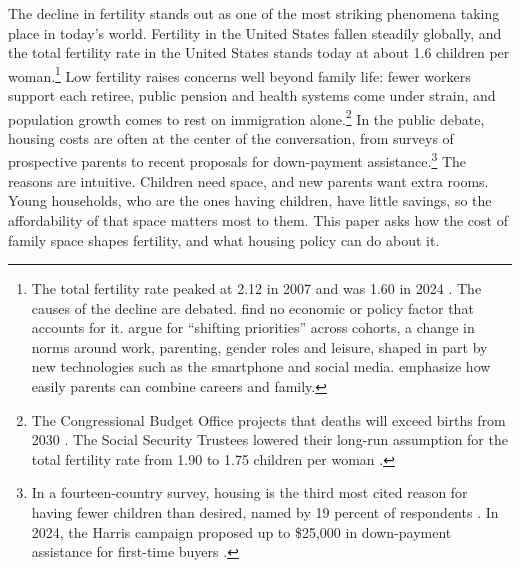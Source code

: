 
The decline in fertility stands out as one of the most striking phenomena taking place in today's world.   
Fertility in the United States  fallen steadily globally, and the
total fertility rate in the United States stands today at about 1.6 children per
woman.\footnote{The total fertility rate peaked at 2.12 in 2007 and was 1.60
in 2024 \citep{cboDemographicOutlook2026}. The causes of the decline are
debated. \citet{kearneyPuzzleFallingUS2022} find no economic or policy
factor that accounts for it. \citet{kearneyLevineWhyFertilityLow2025} argue
for ``shifting priorities'' across cohorts, a change in norms around work,
parenting, gender roles and leisure, shaped in part by new technologies such
as the smartphone and social media.
\citet{doepkeEconomicsFertilityNew2023} emphasize how easily parents can
combine careers and family.} Low fertility raises concerns well beyond
family life: fewer workers support each retiree, public pension and health
systems come under strain, and population growth comes to rest on
immigration alone.\footnote{The Congressional Budget Office projects that
deaths will exceed births from 2030 \citep{cboDemographicOutlook2026}. The
Social Security Trustees lowered their long-run assumption for the total
fertility rate from 1.90 to 1.75 children per woman \citep{ssaTrustees2026}.}
In the public debate, housing costs are often at the center of the
conversation, from surveys of prospective parents to recent proposals for
down-payment assistance.\footnote{In a fourteen-country survey, housing is
the third most cited reason for having fewer children than desired, named by
19 percent of respondents \citep{unfpaSWP2025}. In 2024, the Harris campaign
proposed up to \$25,000 in down-payment assistance for first-time buyers
\citep{harrisCampaign2024}.} The reasons are intuitive. Children need space,
and new parents want extra rooms. Young households, who are the ones having
children, have little savings, so the affordability of that space matters
most to them. This paper asks how the cost of family space shapes fertility,
and what housing policy can do about it.
